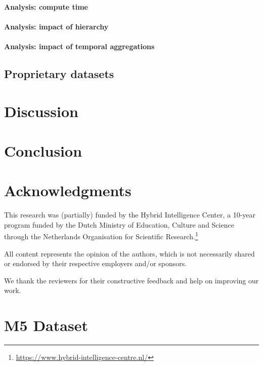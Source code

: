 \documentclass[preprint, 3p, times, twocolumn]{elsarticle}
\begin{document}
  \paragraph{Analysis: compute time}
  
  \paragraph{Analysis: impact of hierarchy}

  \paragraph{Analysis: impact of temporal aggregations}

  
  \subsection{Proprietary datasets}
    \label{subsec:proprietarydatasets}

\section{Discussion}
  \label{sec:discussion}


\section{Conclusion}
  \label{sec:conclusion}

\section*{Acknowledgments}
  This research was (partially) funded by the Hybrid Intelligence Center, a 10-year program funded by the Dutch Ministry of Education, Culture and Science through the Netherlands Organisation for Scientific Research.\footnote{\url{https://www.hybrid-intelligence-centre.nl/}}

  All content represents the opinion of the authors, which is not necessarily shared or endorsed by their respective employers and/or sponsors.
  
  We thank the reviewers for their constructive feedback and help on improving our work. 


 


\clearpage

\appendix

\section{M5 Dataset} \label{app:m5dataset}
\end{document}
